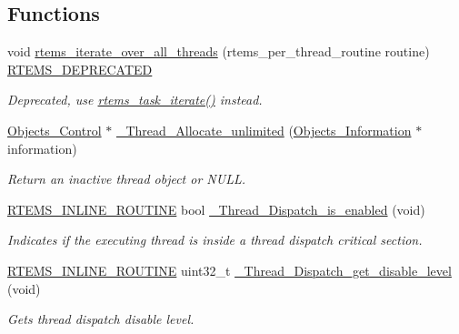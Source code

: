 \subsection*{Functions}
\begin{DoxyCompactItemize}
\item 
void \mbox{\hyperlink{group__RTEMSScoreThread_ga5dc64d34fc67591fa08d18fb6aa055ca}{rtems\+\_\+iterate\+\_\+over\+\_\+all\+\_\+threads}} (rtems\+\_\+per\+\_\+thread\+\_\+routine routine) \mbox{\hyperlink{group__RTEMSScoreBaseDefs_gab651a076d4d51d50221e7ef7ac99d4e7}{R\+T\+E\+M\+S\+\_\+\+D\+E\+P\+R\+E\+C\+A\+T\+ED}}
\begin{DoxyCompactList}\small\item\em Deprecated, use \mbox{\hyperlink{group__ClassicTasks_ga7255f41eb20238aebe5ce139d5dfd97d}{rtems\+\_\+task\+\_\+iterate()}} instead. \end{DoxyCompactList}\item 
\mbox{\hyperlink{structObjects__Control}{Objects\+\_\+\+Control}} $\ast$ \mbox{\hyperlink{group__RTEMSScoreThread_ga2cb5db6d9e872bde5dc6d3d3489bcc19}{\+\_\+\+Thread\+\_\+\+Allocate\+\_\+unlimited}} (\mbox{\hyperlink{structObjects__Information}{Objects\+\_\+\+Information}} $\ast$information)
\begin{DoxyCompactList}\small\item\em Return an inactive thread object or N\+U\+LL. \end{DoxyCompactList}\item 
\mbox{\hyperlink{group__RTEMSScoreBaseDefs_gac216239df231d5dbd15e3520b0b9313f}{R\+T\+E\+M\+S\+\_\+\+I\+N\+L\+I\+N\+E\+\_\+\+R\+O\+U\+T\+I\+NE}} bool \mbox{\hyperlink{group__RTEMSScoreThread_gaa847ae7c8e3c4cf3f3f3f082124eac8e}{\+\_\+\+Thread\+\_\+\+Dispatch\+\_\+is\+\_\+enabled}} (void)
\begin{DoxyCompactList}\small\item\em Indicates if the executing thread is inside a thread dispatch critical section. \end{DoxyCompactList}\item 
\mbox{\hyperlink{group__RTEMSScoreBaseDefs_gac216239df231d5dbd15e3520b0b9313f}{R\+T\+E\+M\+S\+\_\+\+I\+N\+L\+I\+N\+E\+\_\+\+R\+O\+U\+T\+I\+NE}} uint32\+\_\+t \mbox{\hyperlink{group__RTEMSScoreThread_ga3f098a76c363d6d1daff302c5d7a9d9b}{\+\_\+\+Thread\+\_\+\+Dispatch\+\_\+get\+\_\+disable\+\_\+level}} (void)
\begin{DoxyCompactList}\small\item\em Gets thread dispatch disable level. \end{DoxyCompactList}\item 

\end{DoxyCompactItemize}
